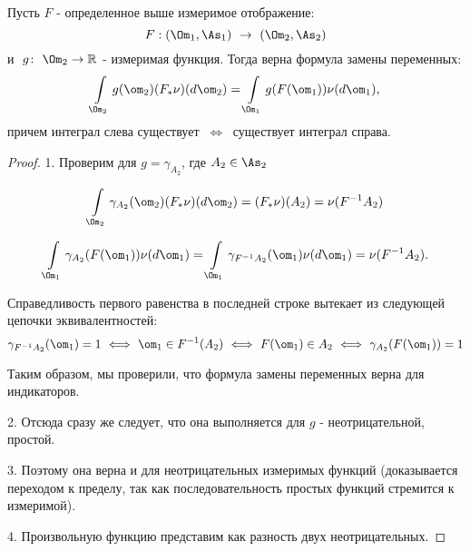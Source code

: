 \documentclass[a4paper]{article}
\begin{document}
\begin{theorem}

Пусть $F$ - определенное выше измеримое отображение:
$$
F: (\Om_1, \As_1)\ \rightarrow\  (\Om_2, \As_2)
$$
 и  $\ g \colon\  \Om_2 \rightarrow \mathbb R$ -
измеримая функция. Тогда верна формула замены переменных:
$$
\int \limits_{\Om_2} g(\om_2) (F_* \nu) (d\om_2) = \int
\limits_{\Om_1} g(F(\om_1)) \nu(d\om_1),
$$
причем интеграл слева существует $\ \Longleftrightarrow\ $
существует интеграл справа.

\end{theorem}
\begin{proof}
1. Проверим для $g= \gamma_{A_2}$, где $A_2 \in \As_2$

$$\int \limits_{\Om_2} \gamma_{A_2} (\om_2) (F_* \nu) (d\om_2) =
(F_*\nu) (A_2) = \nu (F^{-1} A_2)$$

$$ \int \limits_{\Om_1}
\gamma_{A_2} (F(\om_1)) \nu(d\om_1) = \int \limits_{\Om_1}
\gamma_{F^{-1} A_2} (\om_1) \nu (d\om_1) = \nu (F^{-1} A_2).$$

Справедливость первого равенства в последней строке вытекает из
следующей цепочки эквивалентностей:
$$ \gamma_{F^{-1} A_2}
(\om_1) = 1 \ \Longleftrightarrow\  \om_1 \in F^{-1}(A_2) \
\Longleftrightarrow\  F(\om_1) \in A_2 \ \Longleftrightarrow\
\gamma_{A_2} (F(\om_1)) = 1 $$

Таким образом, мы проверили, что формула замены переменных верна
для индикаторов.

2. Отсюда сразу же следует, что она выполняется для $g$ -
неотрицательной, простой.

3. Поэтому она верна и для неотрицательных измеримых функций
(доказывается переходом к пределу, так как последовательность
простых функций стремится к измеримой).

4. Произвольную функцию представим как разность двух
неотрицательных.

\end{proof}
\end{document}
